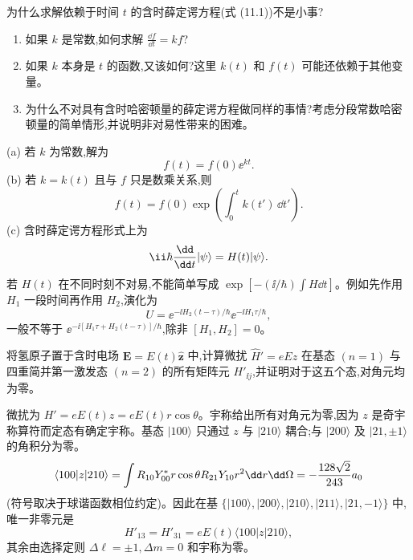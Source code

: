 \begin{question}
为什么求解依赖于时间 $t$ 的含时薛定谔方程(式 (11.1))不是小事?
\begin{enumerate}
\item 如果 $k$ 是常数,如何求解 $\frac{\dd f}{\dd t}=kf$?
\item 如果 $k$ 本身是 $t$ 的函数,又该如何?这里 $k(t)$ 和 $f(t)$ 可能还依赖于其他变量。
\item 为什么不对具有含时哈密顿量的薛定谔方程做同样的事情?考虑分段常数哈密顿量的简单情形,并说明非对易性带来的困难。
\end{enumerate}

\par\smallskip
{}

\end{question}
\begin{solution}
(a) 若 $k$ 为常数,解为
\[
f(t)=f(0)\ee^{kt}.
\]
(b) 若 $k=k(t)$ 且与 $f$ 只是数乘关系,则
\[
f(t)=f(0)\exp\left(\int_0^t k(t')\,\dd t'\right).
\]
(c) 含时薛定谔方程形式上为
\[
\ii\hbar{\dd\over\dd t}|\psi\rangle=H(t)|\psi\rangle.
\]
若 $H(t)$ 在不同时刻不对易,不能简单写成 $\exp[-(\ii/\hbar)\int H\dd t]$。例如先作用 $H_1$ 一段时间再作用 $H_2$,演化为
\[
U=\ee^{-\ii H_2(t-\tau)/\hbar}\ee^{-\ii H_1\tau/\hbar},
\]
一般不等于 $\ee^{-\ii[H_1\tau+H_2(t-\tau)]/\hbar}$,除非 $[H_1,H_2]=0$。
\end{solution}

\begin{question}
将氢原子置于含时电场 $\mathbf E=E(t)\hat{\mathbf z}$ 中,计算微扰 $\hat H'=eEz$ 在基态 $(n=1)$ 与四重简并第一激发态 $(n=2)$ 的所有矩阵元 $H'_{\ii j}$,并证明对于这五个态,对角元均为零。
\end{question}
\begin{solution}
微扰为 $H'=eE(t)z=eE(t)r\cos\theta$。宇称给出所有对角元为零,因为 $z$ 是奇宇称算符而定态有确定宇称。基态 $|100\rangle$ 只通过 $z$ 与 $|210\rangle$ 耦合;与 $|200\rangle$ 及 $|21,\pm1\rangle$ 的角积分为零。
\[
\langle100|z|210\rangle=\int R_{10}Y_{00}^*r\cos\theta R_{21}Y_{10}r^2\dd r\dd\Omega
=-{128\sqrt2\over243}a_0
\]
(符号取决于球谐函数相位约定)。因此在基 $\{|100\rangle,|200\rangle,|210\rangle,|211\rangle,|21,-1\rangle\}$ 中,唯一非零元是
\[
H'_{13}=H'_{31}=eE(t)\langle100|z|210\rangle,
\]
其余由选择定则 $\Delta\ell=\pm1,\Delta m=0$ 和宇称为零。
\end{solution}

